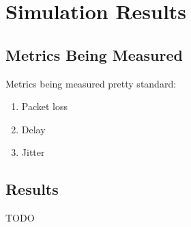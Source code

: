 \chapter{Simulation Results} 

\section{Metrics Being Measured}

Metrics being measured pretty standard: 

\begin{enumerate}
\item Packet loss
\item Delay
\item Jitter
\end{enumerate}

\section{Results}

TODO